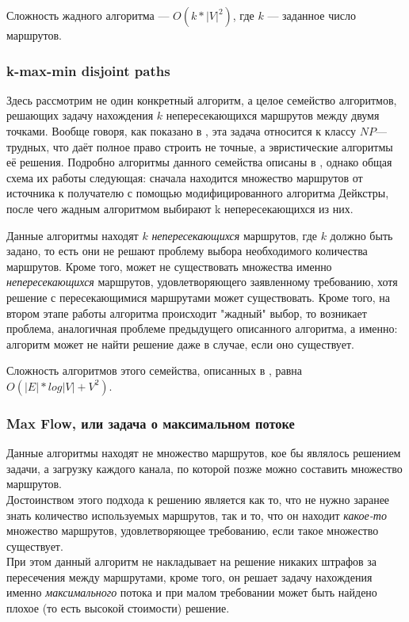 \documentclass[a4paper]{article}
\begin{document}
Сложность жадного алгоритма --- $O(k*|V|^2)$, где $k$ --- заданное число маршрутов.

\subsubsection{k-max-min disjoint paths}
Здесь рассмотрим не один конкретный алгоритм, а целое семейство алгоритмов, решающих задачу нахождения $k$ непересекающихся маршрутов между двумя точками. 
Вообще говоря, как показано в \cite{kmaxmin1}, эта задача относится к классу $NP$---трудных, что даёт полное право строить не точные, а эвристические алгоритмы её решения. 
Подробно алгоритмы данного семейства описаны в \cite{kmaxmin1, kmaxmin2, disjntNPC}, однако общая схема их работы следующая: сначала находится множество маршрутов от источника к получателю с помощью модифицированного алгоритма Дейкстры, после чего жадным алгоритмом выбирают k непересекающихся из них.

Данные алгоритмы находят $k$ \textit{непересекающихся} маршрутов, где $k$ должно быть задано, то есть они не решают проблему выбора необходимого количества маршрутов. Кроме того, может не существовать множества именно \textit{непересекающихся} маршрутов, удовлетворяющего заявленному требованию, хотя решение с пересекающимися маршрутами может существовать. Кроме того, на втором этапе работы алгоритма происходит "жадный" выбор, то возникает проблема, аналогичная проблеме предыдущего описанного алгоритма, а именно: алгоритм может не найти решение даже в случае, если оно существует.

Сложность алгоритмов этого семейства, описанных в \cite{kmaxmin1, kmaxmin2}, равна  $O(|E|*log|V| + V^2)$.

\subsubsection{Max Flow, или задача о максимальном потоке}
Данные алгоритмы находят не множество маршрутов, кое бы являлось решением задачи, а загрузку каждого канала, по которой позже можно составить множество маршрутов.\\ Достоинством этого подхода к решению является как то, что не нужно заранее знать количество используемых маршрутов, так и то, что он находит \textit{какое-то} множество маршрутов, удовлетворяющее требованию, если такое множество существует.\\
При этом данный алгоритм не накладывает на решение никаких штрафов за пересечения между маршрутами, кроме того, он решает задачу нахождения именно \textit{максимального} потока и при малом требовании может быть найдено плохое (то есть высокой стоимости) решение.
\end{document}
